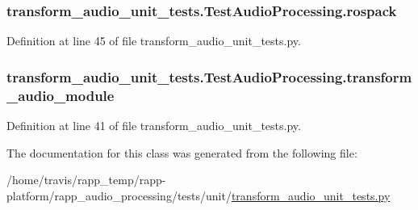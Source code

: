\hypertarget{classtransform__audio__unit__tests_1_1TestAudioProcessing_a3bd387590dace3bf1abda6dcfed8402e}{
\subsubsection[{rospack}]{\setlength{\rightskip}{0pt plus 5cm}transform\-\_\-audio\-\_\-unit\-\_\-tests.\-Test\-Audio\-Processing.\-rospack}}\label{classtransform__audio__unit__tests_1_1TestAudioProcessing_a3bd387590dace3bf1abda6dcfed8402e}


Definition at line 45 of file transform\-\_\-audio\-\_\-unit\-\_\-tests.\-py.

\hypertarget{classtransform__audio__unit__tests_1_1TestAudioProcessing_a7b1be66c70205421b0b9668f02e1fe22}{
\subsubsection[{transform\-\_\-audio\-\_\-module}]{\setlength{\rightskip}{0pt plus 5cm}transform\-\_\-audio\-\_\-unit\-\_\-tests.\-Test\-Audio\-Processing.\-transform\-\_\-audio\-\_\-module}}\label{classtransform__audio__unit__tests_1_1TestAudioProcessing_a7b1be66c70205421b0b9668f02e1fe22}


Definition at line 41 of file transform\-\_\-audio\-\_\-unit\-\_\-tests.\-py.



The documentation for this class was generated from the following file\-:\begin{DoxyCompactItemize}
\item 
/home/travis/rapp\-\_\-temp/rapp-\/platform/rapp\-\_\-audio\-\_\-processing/tests/unit/\hyperlink{transform__audio__unit__tests_8py}{transform\-\_\-audio\-\_\-unit\-\_\-tests.\-py}\end{DoxyCompactItemize}
